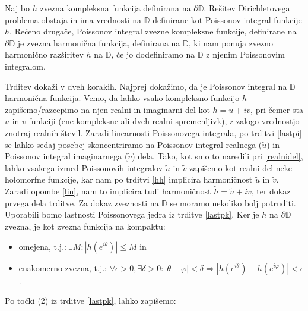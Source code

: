 \documentclass[mat1]{fmfdelo}
\begin{document}
     \begin{trditev}
        \label{obstoj}
        Naj bo $h$ zvezna kompleksna funkcija definirana na $\partial \mathbb{D}$. Rešitev Dirichletovega problema obstaja in ima vrednosti na $\mathbb{D}$ definirane kot Poissonov integral funkcije $h$.
        \newline
        Rečeno drugače, Poissonov integral zvezne kompleksne funkcije, definirane na $\partial \mathbb{D}$ je zvezna harmonična funkcija, definirana na $\mathbb{D}$, ki nam ponuja zvezno harmonično razširitev $h$ na $\overline{\mathbb{D}}$, če jo dodefiniramo na $\mathbb{D}$ z njenim Poissonovim integralom.
     \end{trditev}
     \begin{dokaz}
        Trditev dokaži v dveh korakih. Najprej dokažimo, da je Poissonov integral na $\mathbb{D}$ harmonična funkcija.
        Vemo, da lahko vsako kompleksno funkcijo $h$ zapišemo/razcepimo na njen realni in imaginarni del kot $h = u + iv$, pri čemer sta $u$ in $v$ funkciji (ene kompleksne ali dveh realni spremenljivk), z zalogo vrednostjo znotraj realnih števil. 
        Zaradi linearnosti Poissonovega integrala, po trditvi \ref{lastpi} se lahko sedaj posebej skoncentriramo na Poissonov integral realnega ($\widetilde{u}$) in Poissonov integral imaginarnega ($\widetilde{v}$) dela. 
        Tako, kot smo to naredili pri \ref{realnidel}, lahko vsakega izmed Poissonovih integralov $\widetilde{u}$ in $\widetilde{v}$ zapišemo kot realni del neke holomorfne funkcije, kar nam po trditvi \ref{hh} implicira harmoničnost $\widetilde{u}$ in $\widetilde{v}$.
        Zaradi opombe \ref{lin}, nam to implicira tudi harmoničnost $\widetilde{h} = \widetilde{u} + i\widetilde{v}$, ter dokaz prvega dela trditve. 
        \newline
        Za dokaz zveznosti na $\overline{\mathbb{D}}$ se moramo nekoliko bolj potruditi. Uporabili bomo lastnosti Poissonovega jedra iz trditve \ref{lastpk}. 
        Ker je $h$ na $\partial \mathbb{D}$ zvezna, je kot zvezna funkcija na kompaktu: 
        \begin{itemize}
            \item omejena, t.j.:$~\exists M: |h(e^{i\theta})| \leq M$ in 
            \item enakomerno zvezna, t.j.: $\forall \epsilon > 0, \exists \delta > 0: | \theta - \varphi | < \delta \Rightarrow |h(e^{i\theta}) - h(e^{i\varphi})| < \epsilon $.
        \end{itemize}
        Po točki (2) iz trditve \ref{lastpk}, lahko zapišemo:

\end{dokaz}
\end{document}
